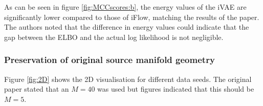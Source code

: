 
As can be seen in figure \ref{fig:MCCscores:b}, the energy values of the iVAE are significantly lower compared to those of iFlow, matching the results of the paper. The authors noted that the difference in energy values could indicate that the gap between the ELBO and the actual log likelihood is not negligible.


\subsubsection{Preservation of original source manifold geometry}
\label{sec:geometry}
Figure \ref{fig:2D} shows the 2D visualisation for different data seeds. The original paper stated that an $M = 40$ was used but figures indicated that this should be $M = 5$.

